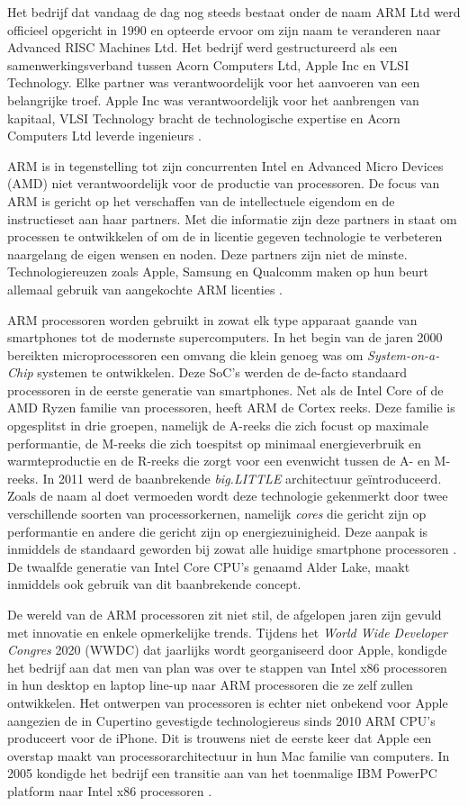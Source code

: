 Het bedrijf dat vandaag de dag nog steeds bestaat onder de naam ARM Ltd werd officieel opgericht in 1990 en opteerde ervoor om zijn naam te veranderen naar Advanced RISC Machines Ltd. Het bedrijf werd gestructureerd als een samenwerkingsverband tussen Acorn Computers Ltd, Apple Inc en VLSI Technology. Elke partner was verantwoordelijk voor het aanvoeren van een belangrijke troef. Apple Inc was verantwoordelijk voor het aanbrengen van kapitaal, VLSI Technology bracht de technologische expertise en Acorn Computers Ltd leverde ingenieurs \autocite{Walshe2015}.

ARM is in tegenstelling tot zijn concurrenten Intel en Advanced Micro Devices (AMD) niet verantwoordelijk voor de productie van processoren. De focus van ARM is gericht op het verschaffen van de intellectuele eigendom en de instructieset aan haar partners. Met die informatie zijn deze partners in staat om processen te ontwikkelen of om de in licentie gegeven technologie te verbeteren naargelang de eigen wensen en noden. Deze partners zijn niet de minste. Technologiereuzen zoals Apple, Samsung en Qualcomm maken op hun beurt allemaal gebruik van aangekochte ARM licenties \autocite{Ahammed2017}.

ARM processoren worden gebruikt in zowat elk type apparaat gaande van smartphones tot de modernste supercomputers. In het begin van de jaren 2000 bereikten microprocessoren een omvang die klein genoeg was om \textit{System-on-a-Chip} systemen te ontwikkelen. Deze SoC’s werden de de-facto standaard processoren in de eerste generatie van smartphones. Net als de Intel Core of de AMD Ryzen familie van processoren, heeft ARM de Cortex reeks. Deze familie is opgesplitst in drie groepen, namelijk de A-reeks die zich focust op maximale performantie, de M-reeks die zich toespitst op minimaal energieverbruik en warmteproductie en de R-reeks die zorgt voor een evenwicht tussen de A- en M-reeks. In 2011 werd de baanbrekende \textit{big.LITTLE} architectuur geïntroduceerd. Zoals de naam al doet vermoeden wordt deze technologie gekenmerkt door twee verschillende soorten van processorkernen, namelijk \textit{cores} die gericht zijn op performantie en andere die gericht zijn op energiezuinigheid. Deze aanpak is inmiddels de standaard geworden bij zowat alle huidige smartphone processoren \autocite{Walshe2015a}. De twaalfde generatie van Intel Core CPU’s genaamd Alder Lake, maakt inmiddels ook gebruik van dit baanbrekende concept.

De wereld van de ARM processoren zit niet stil, de afgelopen jaren zijn gevuld met innovatie en enkele opmerkelijke trends. Tijdens het \textit{World Wide Developer Congres} 2020 (WWDC) dat jaarlijks wordt georganiseerd door Apple, kondigde het bedrijf aan dat men van plan was over te stappen van Intel x86 processoren in hun desktop en laptop line-up naar ARM processoren die ze zelf zullen ontwikkelen. Het ontwerpen van processoren is echter niet onbekend voor Apple aangezien de in Cupertino gevestigde technologiereus sinds 2010 ARM CPU’s produceert voor de iPhone. Dit is trouwens niet de eerste keer dat Apple een overstap maakt van processorarchitectuur in hun Mac familie van computers. In 2005 kondigde het bedrijf een transitie aan van het toenmalige IBM PowerPC platform naar Intel x86 processoren \autocite{Fulton2020}. 

